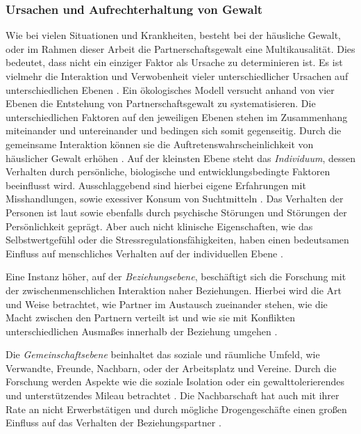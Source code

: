 
\subsubsection{Ursachen und Aufrechterhaltung von Gewalt}     \label{2.1.2.2}
Wie bei vielen Situationen und Krankheiten, besteht bei der häusliche Gewalt, oder im Rahmen dieser Arbeit die Partnerschaftsgewalt eine Multikausalität. Dies bedeutet, dass nicht ein einziger Faktor als Ursache zu determinieren ist. Es ist vielmehr die Interaktion und Verwobenheit vieler unterschiedlicher Ursachen auf unterschiedlichen Ebenen \parencite{Ursache_hG}. Ein ökologisches Modell versucht anhand von vier Ebenen die Entstehung von Partnerschaftsgewalt zu systematisieren. Die unterschiedlichen Faktoren auf den jeweiligen Ebenen stehen im Zusammenhang miteinander und untereinander und bedingen sich somit gegenseitig. Durch die gemeinsame Interaktion können sie die Auftretenswahrscheinlichkeit von häuslicher Gewalt erhöhen \parencite{Ursache_hG_2, Ursache_hG, Gewaltart}.
Auf der kleinsten Ebene steht das \textit{Individuum}, dessen Verhalten durch persönliche, biologische und entwicklungsbedingte Faktoren beeinflusst wird. Ausschlaggebend sind hierbei eigene Erfahrungen mit Misshandlungen, sowie exessiver Konsum von Suchtmitteln \parencite{Ursache_hG_2, Ursache_hG, Gewaltart}. Das Verhalten der Personen ist laut \textcite{Gewaltart} sowie \textcite{Ursache_hG_2} ebenfalls durch psychische Störungen und Störungen der Persönlichkeit geprägt. Aber auch nicht klinische Eigenschaften, wie das Selbstwertgefühl oder die Stressregulationsfähigkeiten, haben einen bedeutsamen Einfluss auf menschliches Verhalten auf der individuellen Ebene \parencite{Ursache_hG}.

Eine Instanz höher, auf der \textit{Beziehungsebene}, beschäftigt sich die Forschung mit der zwischenmenschlichen Interaktion naher Beziehungen. Hierbei wird die Art und Weise betrachtet, wie Partner im Austausch zueinander stehen, wie die Macht zwischen den Partnern verteilt ist und wie sie mit Konflikten unterschiedlichen Ausmaßes innerhalb der Beziehung umgehen \parencite{Ursache_hG_2, Ursache_hG, Gewaltart}.

Die \textit{Gemeinschaftsebene} beinhaltet das soziale und räumliche Umfeld, wie Verwandte, Freunde, Nachbarn, oder der Arbeitsplatz und Vereine. Durch die Forschung werden Aspekte wie die soziale Isolation oder ein gewalttolerierendes und unterstützendes Mileau betrachtet \parencite{Ursache_hG_2, Ursache_hG, Gewaltart}. Die Nachbarschaft hat auch mit ihrer Rate an nicht Erwerbstätigen und durch mögliche Drogengeschäfte einen großen Einfluss auf das Verhalten der Beziehungspartner \parencite{Ursache_hG, Gewaltart}.

